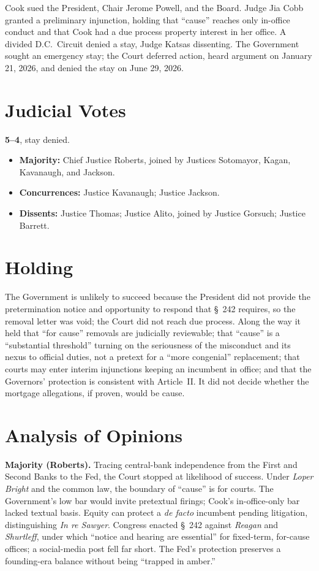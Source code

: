 \documentclass[12pt]{article}
\begin{document}
Cook sued the President, Chair Jerome Powell, and the Board. Judge Jia Cobb granted a preliminary injunction, holding that ``cause'' reaches only in-office conduct and that Cook had a due process property interest in her office. A divided D.C.\ Circuit denied a stay, Judge Katsas dissenting. The Government sought an emergency stay; the Court deferred action, heard argument on January 21, 2026, and denied the stay on June 29, 2026.

\section{Judicial Votes}

\textbf{5--4}, stay denied.
\begin{itemize}
\item \textbf{Majority:} Chief Justice Roberts, joined by Justices Sotomayor, Kagan, Kavanaugh, and Jackson.
\item \textbf{Concurrences:} Justice Kavanaugh; Justice Jackson.
\item \textbf{Dissents:} Justice Thomas; Justice Alito, joined by Justice Gorsuch; Justice Barrett.
\end{itemize}

\section{Holding}

The Government is unlikely to succeed because the President did not provide the pretermination notice and opportunity to respond that \S~242 requires, so the removal letter was void; the Court did not reach due process. Along the way it held that ``for cause'' removals are judicially reviewable; that ``cause'' is a ``substantial threshold'' turning on the seriousness of the misconduct and its nexus to official duties, not a pretext for a ``more congenial'' replacement; that courts may enter interim injunctions keeping an incumbent in office; and that the Governors' protection is consistent with Article~II. It did not decide whether the mortgage allegations, if proven, would be cause.

\section{Analysis of Opinions}

\textbf{Majority (Roberts).} Tracing central-bank independence from the First and Second Banks to the Fed, the Court stopped at likelihood of success. Under \textit{Loper Bright} and the common law, the boundary of ``cause'' is for courts. The Government's low bar would invite pretextual firings; Cook's in-office-only bar lacked textual basis. Equity can protect a \textit{de facto} incumbent pending litigation, distinguishing \textit{In re Sawyer}. Congress enacted \S~242 against \textit{Reagan} and \textit{Shurtleff}, under which ``notice and hearing are essential'' for fixed-term, for-cause offices; a social-media post fell far short. The Fed's protection preserves a founding-era balance without being ``trapped in amber.''
\end{document}

